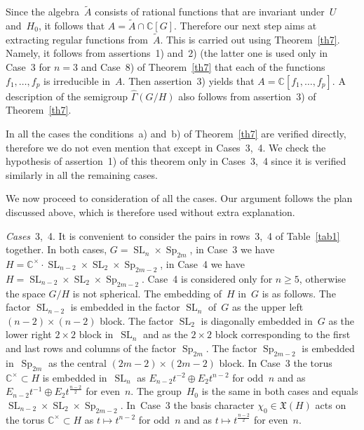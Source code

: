 \documentclass[12pt]{amsart}
\theoremstyle{definition}
\theoremstyle{remark}
\begin{document}
Since the algebra~$\tilde A$ consists of rational functions that are
invariant under~$U$ and~$H_0$, it follows that $A=\tilde A \cap
\mathbb{C}[G]$. Therefore our next step aims at extracting regular
functions from~$\tilde A$. This is carried out using
Theorem~\ref{th7}. Namely, it follows from assertions~1) and~2) (the
latter one is used only in Case~3 for $n=3$ and Case~8) of
Theorem~\ref{th7} that each of the functions $f_1,\dots,f_p$ is
irreducible in~$A$. Then assertion~3) yields that
$A=\mathbb{C}[f_1,\dots,f_p]$. A description of the semigroup
$\widehat\Gamma(G/H)$ also follows from assertion~3) of
Theorem~\ref{th7}.

In all the cases the conditions~a) and~b) of Theorem~\ref{th7} are
verified directly, therefore we do not even mention that except in
Cases~3,~4. We check the hypothesis of assertion~1) of this theorem
only in Cases~3,~4 since it is verified similarly in all the
remaining cases.

We now proceed to consideration of all the cases. Our argument
follows the plan discussed above, which is therefore used without
extra explanation.

\textsl{Cases}~3,~4. It is convenient to consider the pairs in
rows~3,~4 of Table~\ref{tab1} together. In both cases,
$G={\operatorname{SL}}_n\times {\operatorname{Sp}}_{2m}$, in Case~3 we have
$H=\mathbb{C}^{\times}\cdot {\operatorname{SL}}_{n-2}\times {\operatorname{SL}}_2\times
{\operatorname{Sp}}_{2m-2}$, in Case~4 we have $H={\operatorname{SL}}_{n-2}\times {\operatorname{SL}}_2\times
{\operatorname{Sp}}_{2m-2}$. Case~4 is considered only for $n{\geqslant}5$, otherwise the
space $G/H$ is not spherical. The embedding of~$H$ in~$G$ is as
follows. The factor ${\operatorname{SL}}_{n-2}$ is embedded in the factor ${\operatorname{SL}}_n$
of~$G$ as the upper left $(n-2)\times (n-2)$ block. The factor
${\operatorname{SL}}_2$ is diagonally embedded in~$G$ as the lower right $2\times
2$ block in~${\operatorname{SL}}_n$ and as the $2\times 2$ block corresponding to
the first and last rows and columns of the factor ${\operatorname{Sp}}_{2m}$. The
factor ${\operatorname{Sp}}_{2m-2}$ is embedded in~${\operatorname{Sp}}_{2m}$ as the central
$(2m-2)\times (2m-2)$ block. In Case~3 the torus
$\mathbb{C}^\times\subset H$ is embedded in~${\operatorname{SL}}_n$ as
$E_{n-2}t^{-2}\oplus E_2t^{n-2}$ for odd~$n$ and as
$E_{n-2}t^{-1}\oplus E_2t^{\frac{n-2}2}$ for even~$n$. The
group~$H_0$ is the same in both cases and equals ${\operatorname{SL}}_{n-2}\times
{\operatorname{SL}}_2\times {\operatorname{Sp}}_{2m-2}$. In~Case~3 the basis character
$\chi_0\in\mathfrak{X}(H)$ acts on the torus
$\mathbb{C}^\times\subset H$ as $t\mapsto t^{n-2}$ for odd~$n$ and
as $t\mapsto t^{\frac{n-2}2}$ for even~$n$.
\end{document}
